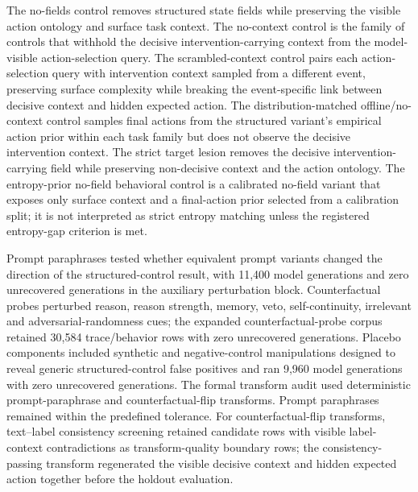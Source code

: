 ﻿\documentclass[preprint,12pt,authoryear]{elsarticle}
\begin{document}
The no-fields control removes structured state fields while preserving the visible action ontology and surface task context. The no-context control is the family of controls that withhold the decisive intervention-carrying context from the model-visible action-selection query. The scrambled-context control pairs each action-selection query with intervention context sampled from a different event, preserving surface complexity while breaking the event-specific link between decisive context and hidden expected action. The distribution-matched offline/no-context control samples final actions from the structured variant's empirical action prior within each task family but does not observe the decisive intervention context. The strict target lesion removes the decisive intervention-carrying field while preserving non-decisive context and the action ontology. The entropy-prior no-field behavioral control is a calibrated no-field variant that exposes only surface context and a final-action prior selected from a calibration split; it is not interpreted as strict entropy matching unless the registered entropy-gap criterion is met.

Prompt paraphrases tested whether equivalent prompt variants changed the direction of the structured-control result, with 11,400 model generations and zero unrecovered generations in the auxiliary perturbation block. Counterfactual probes perturbed reason, reason strength, memory, veto, self-continuity, irrelevant and adversarial-randomness cues; the expanded counterfactual-probe corpus retained 30,584 trace/behavior rows with zero unrecovered generations. Placebo components included synthetic and negative-control manipulations designed to reveal generic structured-control false positives and ran 9,960 model generations with zero unrecovered generations. The formal transform audit used deterministic prompt-paraphrase and counterfactual-flip transforms. Prompt paraphrases remained within the predefined tolerance. For counterfactual-flip transforms, text--label consistency screening retained candidate rows with visible label-context contradictions as transform-quality boundary rows; the consistency-passing transform regenerated the visible decisive context and hidden expected action together before the holdout evaluation.
\end{document}
